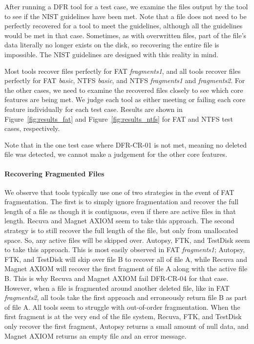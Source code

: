 After running a DFR tool for a test case, we examine the files output by the tool to see if the NIST guidelines have been met.
Note that a file does not need to be perfectly recovered for a tool to meet the guidelines, although all the guidelines would be met in that case.
Sometimes, as with overwritten files, part of the file's data literally no longer exists on the disk, so recovering the entire file is impossible.
The NIST guidelines are designed with this reality in mind.

Most tools recover files perfectly for FAT \emph{fragments1}, and all tools recover files perfectly for FAT \emph{basic}, NTFS \emph{basic}, and NTFS \emph{fragments1} and \emph{fragments2}.
For the other cases, we need to examine the recovered files closely to see which core features are being met.
We judge each tool as either meeting or failing each core feature individually for each test case.
Results are shown in Figure~\ref{fig:results_fat} and Figure~\ref{fig:results_ntfs} for FAT and NTFS test cases, respectively.

Note that in the one test case where DFR-CR-01 is not met, meaning no deleted file was detected, we cannot make a judgement for the other core features.



\paragraph{Recovering Fragmented Files}
We observe that tools typically use one of two strategies in the event of FAT fragmentation.
The first is to simply ignore fragmentation and recover the full length of a file as though it is contiguous, even if there are active files in that length.
Recuva and Magnet AXIOM seem to take this approach.
The second strategy is to still recover the full length of the file, but only from unallocated space.
So, any active files will be skipped over.
Autopsy, FTK, and TestDisk seem to take this approach.
This is most easily observed in FAT \emph{fragments1}; Autopsy, FTK, and TestDisk will skip over file B to recover all of file A, while Recuva and Magnet AXIOM will recover the first fragment of file A along with the active file B.
This is why Recuva and Magnet AXIOM fail DFR-CR-04 for that case.
However, when a file is fragmented around another deleted file, like in FAT \emph{fragments2}, all tools take the first approach and erroneously return file B as part of file A.
All tools seem to struggle with out-of-order fragmentation.
When the first fragment is at the very end of the file system, Recuva, FTK, and TestDisk only recover the first fragment, Autopsy returns a small amount of null data, and Magnet AXIOM returns an empty file and an error message.

